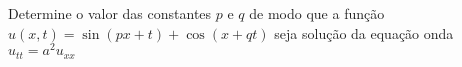 \linespread{1.5}
Determine o valor das constantes $p$ e $q$ de modo que a função $u(x, t) = \sin{(px + t)} + \cos{(x + qt)}$ seja solução da equação onda $u_{tt} = a^2u_{xx}$